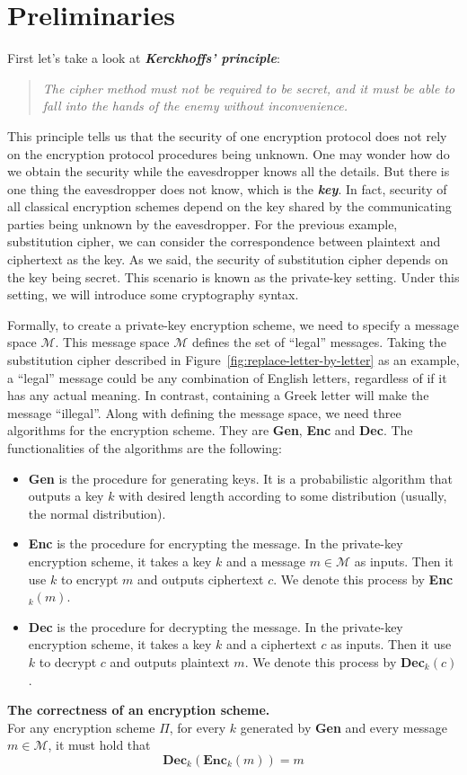 \section{Preliminaries}
\par First let's take a look at \textbf{\textit{Kerckhoffs’ principle}}:
\begin{quote}
    \textit{The cipher method must not be required to be secret, and it must be able to fall into the hands of the enemy without inconvenience.}
\end{quote}
This principle tells us that the security of one encryption protocol does not rely on the encryption protocol procedures being unknown. One may wonder how do we obtain the security while the eavesdropper knows all the details. But there is one thing the eavesdropper does not know, which is the \textbf{\textit{key}}. In fact, security of all classical encryption schemes depend on the key shared by the communicating parties being unknown by the eavesdropper. For the previous example, substitution cipher, we can consider the correspondence between plaintext and ciphertext as the key. As we said, the security of substitution cipher depends on the key being secret. This scenario is known as the private-key setting. Under this setting, we will introduce some cryptography syntax.
\par Formally, to create a private-key encryption scheme, we need to specify a message space $\mathcal{M}$. This message space $\mathcal{M}$ defines the set of ``legal'' messages. Taking the substitution cipher described in Figure~\ref{fig:replace-letter-by-letter} as an example, a ``legal'' message could be any combination of English letters, regardless of if it has any actual meaning. In contrast, containing a Greek letter will make the message  ``illegal''. Along with defining the message space, we need three algorithms for the encryption scheme. They are \textbf{Gen}, \textbf{Enc} and \textbf{Dec}. The functionalities of the algorithms are the following:
\begin{itemize}
    \item \textbf{Gen} is the procedure for generating keys. It is a probabilistic algorithm that outputs a key $k$ with desired length according to some distribution (usually, the normal distribution).
    \item \textbf{Enc} is the procedure for encrypting the message. In the private-key encryption scheme, it takes a key $k$ and a message $m \in \mathcal{M}$ as inputs. Then it use $k$ to encrypt $m$ and outputs ciphertext $c$. We denote this process by \textbf{Enc}$_k(m)$.
    \item \textbf{Dec} is the procedure for decrypting the message. In the private-key encryption scheme, it takes a key $k$ and a ciphertext $c$ as inputs. Then it use $k$ to decrypt $c$ and outputs plaintext $m$. We denote this process by \textbf{Dec}$_k(c)$.
\end{itemize}
\begin{definition} \textbf{The correctness of an encryption scheme.} \\
    For any encryption scheme $\Pi$, for every $k$ generated by \textbf{Gen} and every message $m \in \mathcal{M}$, it must hold that \[\textbf{Dec}_k(\textbf{Enc}_k(m)) = m\]
\end{definition}
